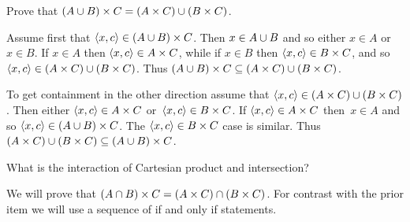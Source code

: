 \documentclass{ibl}  %
\begin{document}
\begin{problem}[\maxlength] 
\begin{exes}
\begin{exercise}
  Prove that $(A\cup B)\times C=(A\times C)\cup(B\times C)$.
\end{exercise}
\begin{answer}
  Assume first that $\langle x,c\rangle\in (A\cup B)\times C$.
  Then $x\in A\cup B$ and so either $x\in A$ or~$x\in B$.
  If $x\in A$ then $\langle x,c\rangle\in A\times C$, while 
  if $x\in B$ then $\langle x,c\rangle\in B\times C$, and so 
  $\langle x,c\rangle\in (A\times C)\cup (B\times C)$.
  Thus $(A\cup B)\times C\subseteq (A\times C)\cup (B\times C)$.
  
  To get containment in the other direction assume that 
  $\langle x,c\rangle\in (A\times C)\cup (B\times C)$.
  Then either $\langle x,c\rangle\in A\times C$ or~$\langle x,c\rangle\in B\times C$.
  If $\langle x,c\rangle\in A\times C$ then~$x\in A$ and so 
  $\langle x,c\rangle\in (A\cup B)\times C$.
  The  $\langle x,c\rangle\in B\times C$ case is similar.
  Thus $(A\times C)\cup (B\times C)\subseteq (A\cup B)\times C$.   
\end{answer}
\begin{exercise}
  What is the interaction of Cartesian product and intersection?
\end{exercise}
\begin{answer}
\item We will prove that 
  $(A\cap B)\times C = (A\times C)\cap (B\times C)$.
  For contrast with the prior item
  we will use a sequence of if and only if statements.


\end{answer}
\end{exes}
\end{problem}
\end{document}
